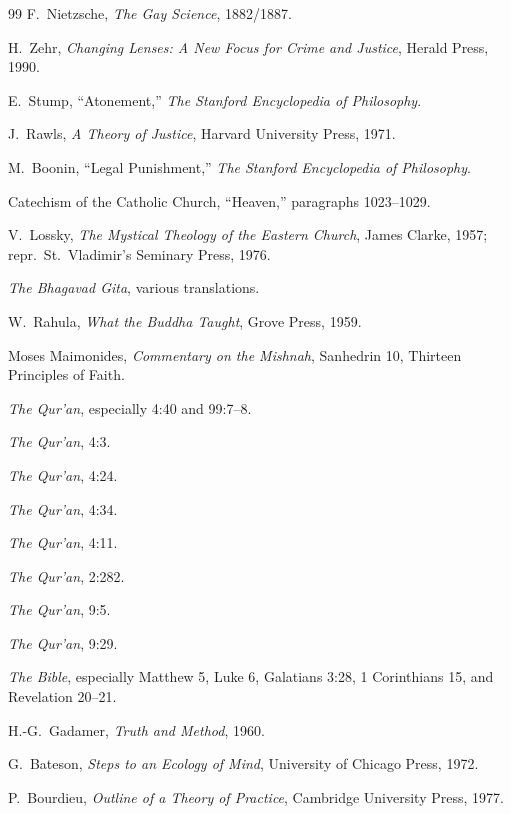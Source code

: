 \documentclass[11pt]{article}
\theoremstyle{remark}
\theoremstyle{plain}
\begin{document}
\begin{thebibliography}{99}
F.\ Nietzsche,
\emph{The Gay Science},
1882/1887.

H.\ Zehr,
\emph{Changing Lenses: A New Focus for Crime and Justice},
Herald Press, 1990.

E.\ Stump,
``Atonement,''
\emph{The Stanford Encyclopedia of Philosophy}.

J.\ Rawls,
\emph{A Theory of Justice},
Harvard University Press, 1971.

M.\ Boonin,
``Legal Punishment,''
\emph{The Stanford Encyclopedia of Philosophy}.

Catechism of the Catholic Church,
``Heaven,'' paragraphs 1023--1029.

V.\ Lossky,
\emph{The Mystical Theology of the Eastern Church},
James Clarke, 1957; repr.\ St.\ Vladimir's Seminary Press, 1976.

\emph{The Bhagavad Gita},
various translations.

W.\ Rahula,
\emph{What the Buddha Taught},
Grove Press, 1959.

Moses Maimonides,
\emph{Commentary on the Mishnah}, Sanhedrin 10, Thirteen Principles of Faith.

\emph{The Qur'an},
especially 4:40 and 99:7--8.

\emph{The Qur'an}, 4:3.

\emph{The Qur'an}, 4:24.

\emph{The Qur'an}, 4:34.

\emph{The Qur'an}, 4:11.

\emph{The Qur'an}, 2:282.

\emph{The Qur'an}, 9:5.

\emph{The Qur'an}, 9:29.

\emph{The Bible},
especially Matthew 5, Luke 6, Galatians 3:28, 1 Corinthians 15, and
Revelation 20--21.

H.-G.\ Gadamer,
\emph{Truth and Method},
1960.

G.\ Bateson,
\emph{Steps to an Ecology of Mind},
University of Chicago Press, 1972.

P.\ Bourdieu,
\emph{Outline of a Theory of Practice},
Cambridge University Press, 1977.


\end{thebibliography}
\end{document}
